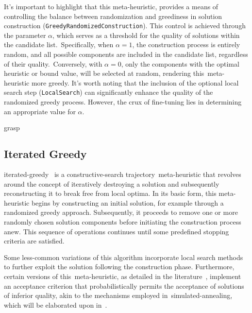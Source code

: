 It's important to highlight that this meta-heuristic, provides a means of
controlling the balance between randomization and greediness in solution
construction (\texttt{GreedyRandomizedConstruction}). This control is
achieved through the parameter $\alpha$, which serves as a threshold for the
quality of solutions within the candidate list.~Specifically, when $\alpha = 1$,
the construction process is entirely random, and all possible components are
included in the candidate list, regardless of their quality.~Conversely, with
$\alpha = 0$, only the components with the optimal heuristic or bound value,
will be selected at random, rendering this~\acrshort{meta-heuristic} more
greedy. It's worth noting that the inclusion of the optional local search step
(\texttt{LocalSearch}) can significantly enhance the quality of the randomized
greedy process. However, the crux of fine-tuning lies in determining an
appropriate value for $\alpha$.

\begin{algorithm}
  
  \caption{\acrlong{grasp}}
  \label{algorithm:grasp}
\end{algorithm}

\subsection{Iterated Greedy}
\label{subsec:iterated-greedy}

\acrfull{iterated-greedy}~\cite{stutzle2018iterated,outeiro2021application} is a
\acrshort{constructive-search} trajectory~\acrshort{meta-heuristic} that
revolves around the concept of iteratively destroying a solution and
subsequently reconstructing it to break free from local optima. In its basic
form, this \acrshort{meta-heuristic} begins by constructing an initial solution,
for example through a randomized greedy approach. Subsequently, it proceeds to
remove one or more randomly chosen solution components before initiating the
construction process anew. This sequence of operations continues until some
predefined stopping criteria are satisfied.

Some less-common variations of this algorithm incorporate local search methods
to further exploit the solution following the construction phase. Furthermore,
certain versions of this~\acrshort{meta-heuristic}, as detailed in the
literature~\cite{stutzle2018iterated}, implement an acceptance criterion that
probabilistically permits the acceptance of solutions of inferior quality, akin
to the mechanisms employed in~\acrshort{simulated-annealing}, which will be
elaborated upon in~.

